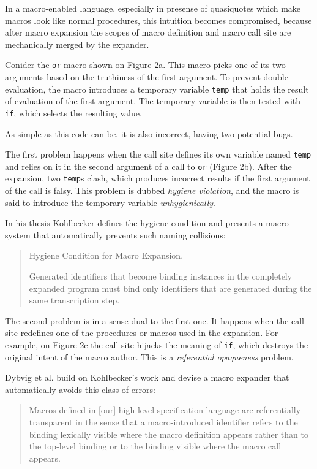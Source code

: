 \documentclass[10pt,journal,a4paper]{IEEEtran}
\begin{document}
In a macro-enabled language, especially in presense of quasiquotes which make
macros look like normal procedures, this intuition becomes compromised,
because after macro expansion the scopes of macro definition and macro call site
are mechanically merged by the expander.

Conider the \texttt{or} macro shown on Figure 2a. This macro picks one of its two arguments
based on the truthiness of the first argument. To prevent double evaluation, the macro introduces
a temporary variable \texttt{temp} that holds the result of evaluation of the first argument.
The temporary variable is then tested with \texttt{if}, which selects the resulting value.

As simple as this code can be, it is also incorrect, having two potential bugs.

The first problem happens when the call site defines its own variable named \texttt{temp}
and relies on it in the second argument of a call to \texttt{or} (Figure 2b). After the expansion, two
\texttt{temp}s clash, which produces incorrect results if the first argument of the call is falsy.
This problem is dubbed \emph{hygiene violation}, and the macro is said to introduce the temporary
variable \emph{unhygienically}.

In his thesis \cite{kohlbecker86} Kohlbecker defines the hygiene condition
and presents a macro system that automatically prevents such naming collisions:
\begin{quote}
Hygiene Condition for Macro Expansion.

Generated identifiers that become binding instances in the
completely expanded program must bind only identifiers that are
generated during the same transcription step.
\end{quote}

The second problem is in a sense dual to the first one. It happens when the call site
redefines one of the procedures or macros used in the expansion. For example, on Figure 2c
the call site hijacks the meaning of \texttt{if}, which destroys the original intent of the
macro author. This is a \emph{referential opaqueness} problem.

Dybvig et al. \cite{dybvig92} build on Kohlbecker's work and devise a macro expander that
automatically avoids this class of errors:
\begin{quote}
Macros defined in [our] high-level specification language are
referentially transparent in the sense that a macro-introduced
identifier refers to the binding lexically visible where the macro
definition appears rather than to the top-level binding or to the
binding visible where the macro call appears.
\end{quote}
\end{document}
